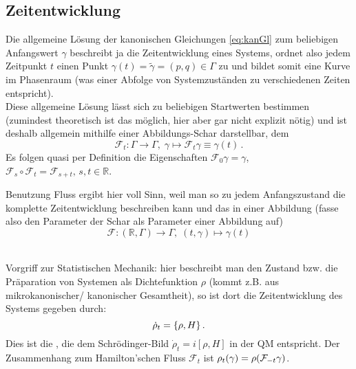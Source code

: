 \documentclass[../class_mech_main.tex]{subfiles}
\begin{document}
	\subsection{Zeitentwicklung}
Die allgemeine Lösung der kanonischen Gleichungen \eqref{eq:kanGl} zum beliebigen Anfangswert $\gamma$ beschreibt ja die Zeitentwicklung eines Systems, ordnet also jedem Zeitpunkt $t$ einen Punkt $\gamma(t) = \tilde{\gamma} = (p,q) \in \Gamma$ zu und bildet somit eine Kurve im Phasenraum (was einer Abfolge von Systemzuständen zu verschiedenen Zeiten entspricht).\\
Diese allgemeine Lösung lässt sich zu beliebigen Startwerten bestimmen (zumindest theoretisch ist das möglich, hier aber gar nicht explizit nötig) und ist deshalb allgemein mithilfe einer Abbildungs-Schar darstellbar, dem 
\begin{equation}
\mathcal{F}_t : \Gamma \rightarrow \Gamma, \; \gamma \mapsto \mathcal{F}_t \gamma \equiv \gamma(t) \, .
\end{equation}
Es folgen quasi per Definition die Eigenschaften $\mathcal{F}_0 \gamma = \gamma$, $\mathcal{F}_s \circ \mathcal{F}_t = \mathcal{F}_{s+t}, \, s,t \in \mathbb{R}$.

Benutzung Fluss ergibt hier voll Sinn, weil man so zu jedem Anfangszustand die komplette Zeitentwicklung beschreiben kann und das in einer Abbildung (fasse also den Parameter der Schar als Parameter einer Abbildung auf)
\begin{equation}
\mathcal{F}: (\mathbb{R}, \Gamma) \rightarrow \Gamma, \; (t, \gamma) \mapsto \gamma(t)
\end{equation}

	\\

Vorgriff zur Statistischen Mechanik: hier beschreibt man den Zustand bzw. die Präparation von Systemen als Dichtefunktion $\rho$ (kommt z.B. aus mikrokanonischer/ kanonischer Gesamtheit), so ist dort die Zeitentwicklung des Systems gegeben durch:
\begin{equation}
\dot{\rho}_t = \qty{\rho, H} \, .
\end{equation}
Dies ist die , die dem Schrödinger-Bild $\dot{\rho}_t = i [\rho, H]$ in der QM entspricht. Der Zusammenhang zum Hamilton'schen Fluss $\mathcal{F}_t$ ist $\rho_t(\gamma) = \rho\qty(\mathcal{F}_{-t} \gamma)$.\\
\end{document}
